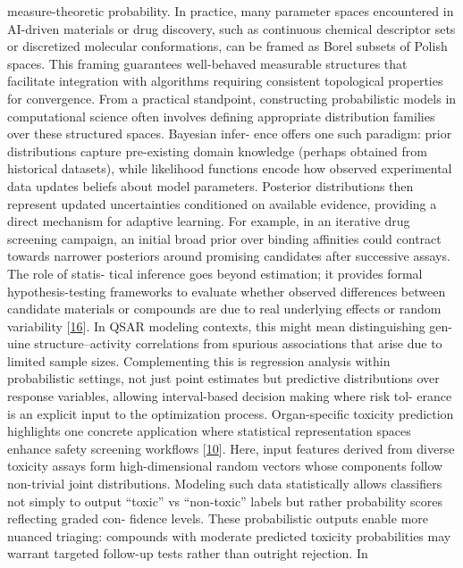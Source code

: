 \documentclass[
]{article}
\begin{document}
measure-theoretic probability. In practice, many parameter spaces
encountered in AI-driven materials or drug discovery, such as continuous
chemical descriptor sets or discretized molecular conformations, can be
framed as Borel subsets of Polish spaces. This framing guarantees
well-behaved measurable structures that facilitate integration with
algorithms requiring consistent topological properties for convergence.
From a practical standpoint, constructing probabilistic models in
computational science often involves defining appropriate distribution
families over these structured spaces. Bayesian infer- ence offers one
such paradigm: prior distributions capture pre-existing domain knowledge
(perhaps obtained from historical datasets), while likelihood functions
encode how observed experimental data updates beliefs about model
parameters. Posterior distributions then represent updated uncertainties
conditioned on available evidence, providing a direct mechanism for
adaptive learning. For example, in an iterative drug screening campaign,
an initial broad prior over binding affinities could contract towards
narrower posteriors around promising candidates after successive assays.
The role of statis- tical inference goes beyond estimation; it provides
formal hypothesis-testing frameworks to evaluate whether observed
differences between candidate materials or compounds are due to real
underlying effects or random variability
{[}\hyperref[_bookmark56]{16}{]}. In QSAR modeling contexts, this might
mean distinguishing gen- uine structure--activity correlations from
spurious associations that arise due to limited sample sizes.
Complementing this is regression analysis within probabilistic settings,
not just point estimates but predictive distributions over response
variables, allowing interval-based decision making where risk tol-
erance is an explicit input to the optimization process. Organ-specific
toxicity prediction highlights one concrete application where
statistical representation spaces enhance safety screening workflows
{[}\hyperref[_bookmark50]{10}{]}. Here, input features derived from
diverse toxicity assays form high-dimensional random vectors whose
components follow non-trivial joint distributions. Modeling such data
statistically allows classifiers not simply to output ``toxic'' vs
``non-toxic'' labels but rather probability scores reflecting graded
con- fidence levels. These probabilistic outputs enable more nuanced
triaging: compounds with moderate predicted toxicity probabilities may
warrant targeted follow-up tests rather than outright rejection. In
\end{document}
